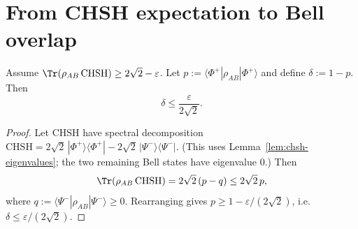 \section{From CHSH expectation to Bell overlap}

\begin{lemma}
\label{lem:bell-overlap}
\notready
Assume $\Tr(\rho_{AB}\,\mathrm{CHSH})\ge 2\sqrt2-\varepsilon$.
Let $p:=\langle\Phi^+|\rho_{AB}|\Phi^+\rangle$ and define $\delta:=1-p$.
Then
\[
\delta \le \frac{\varepsilon}{2\sqrt2}.
\]
\end{lemma}

\begin{proof}
Let $\mathrm{CHSH}$ have spectral decomposition
\(
\mathrm{CHSH}=2\sqrt2\,|\Phi^+\rangle\langle\Phi^+| -2\sqrt2\,|\Psi^-\rangle\langle\Psi^-|.
\)
(This uses Lemma~\ref{lem:chsh-eigenvalues}; the two remaining Bell states have eigenvalue $0$.)
Then
\[
\Tr(\rho_{AB}\,\mathrm{CHSH}) = 2\sqrt2\,(p-q)\le 2\sqrt2\,p,
\]
where $q:=\langle\Psi^-|\rho_{AB}|\Psi^-\rangle\ge 0$.
Rearranging gives $p\ge 1-\varepsilon/(2\sqrt2)$, i.e. $\delta\le\varepsilon/(2\sqrt2)$.
\end{proof}
